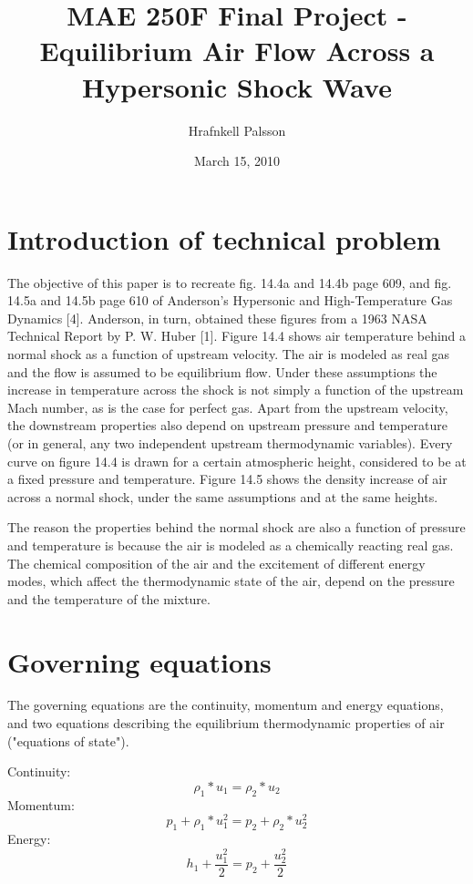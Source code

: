 \documentclass[9pt]{article}
\title{MAE 250F Final Project - Equilibrium Air Flow Across a Hypersonic Shock Wave}
\author{Hrafnkell Palsson}
\date{March 15, 2010}
\begin{document}
\maketitle

\section*{Introduction of technical problem}
The objective of this paper is to recreate fig. 14.4a and 14.4b page 609, and fig. 14.5a and 14.5b page 610 of Anderson's Hypersonic and High-Temperature Gas Dynamics [4]. Anderson, in turn, obtained these figures from a 1963 NASA Technical Report by P. W. Huber [1]. Figure 14.4 shows air temperature behind a normal shock as a function of upstream velocity. The air is modeled as real gas and the flow is assumed to be equilibrium flow. Under these assumptions the increase in temperature across the shock is not simply a function of the upstream Mach number, as is the case for perfect gas. Apart from the upstream velocity, the downstream properties also depend on upstream pressure and temperature (or in general, any two independent upstream thermodynamic variables). Every curve on figure 14.4 is drawn for a certain atmospheric height, considered to be at a fixed pressure and temperature. Figure 14.5 shows the density increase of air across a normal shock, under the same assumptions and at the same heights.

The reason the properties behind the normal shock are also a function of pressure and temperature is because the air is modeled as a chemically reacting real gas. The chemical composition of the air and the excitement of different energy modes, which affect the thermodynamic state of the air, depend on the pressure and the temperature of the mixture.

\section*{Governing equations}
The governing equations are the continuity, momentum and energy equations, and two equations describing the equilibrium thermodynamic properties of air ("equations of state").

\noindent Continuity:
\begin{equation}
\label{cont}
\rho_{1}*u_{1} = \rho_{2}*u_{2}
\end{equation}
Momentum:
\begin{equation}
\label{mom}
p_{1}+\rho_{1}*u_{1}^{2}=p_{2}+\rho_{2}*u_{2}^{2}
\end{equation}
Energy:
\begin{equation}
\label{energy}
h_{1}+\frac{u_{1}^{2}}{2}=p_{2}+\frac{u_{2}^{2}}{2}
\end{equation}
\end{document}
